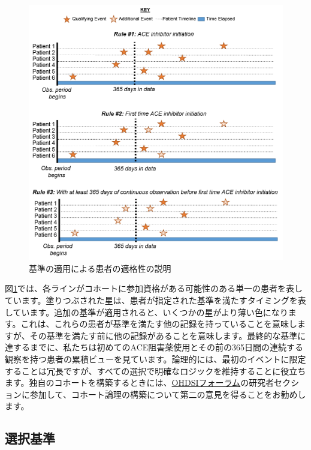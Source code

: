 \documentclass[
  11pt]{book}
\theoremstyle{definition}
\theoremstyle{definition}
\theoremstyle{definition}
\theoremstyle{definition}
\theoremstyle{remark}
\begin{document}
\begin{figure}

{\centering \includegraphics[width=1\linewidth]{images/Cohorts/EarliestEventExplained} 

}

\caption{基準の適用による患者の適格性の説明}\label{fig:EarliestEventExplained}
\end{figure}

図\ref{fig:EarliestEventExplained}では、各ラインがコホートに参加資格がある可能性のある単一の患者を表しています。塗りつぶされた星は、患者が指定された基準を満たすタイミングを表しています。追加の基準が適用されると、いくつかの星がより薄い色になります。これは、これらの患者が基準を満たす他の記録を持っていることを意味しますが、その基準を満たす前に他の記録があることを意味します。最終的な基準に達するまでに、私たちは初めてのACE阻害薬使用とその前の365日間の連続する観察を持つ患者の累積ビューを見ています。論理的には、最初のイベントに限定することは冗長ですが、すべての選択で明確なロジックを維持することに役立ちます。独自のコホートを構築するときには、\href{http://forums.ohdsi.org}{OHDSIフォーラム}の研究者セクションに参加して、コホート論理の構築について第二の意見を得ることをお勧めします。

\subsection{選択基準}\label{ux9078ux629eux57faux6e96}
\end{document}
